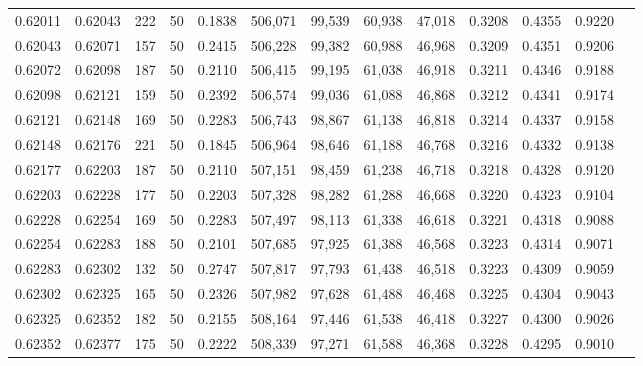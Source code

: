 \begin{tabular}{rrrrrrrrrrrrr}
0.62011 & 0.62043 &   222 &  50 &                                     0.1838 & 506,071 &  99,539 &  60,938 &  47,018 & 0.3208 & 0.4355 & 0.9220 \\
0.62043 & 0.62071 &   157 &  50 &                                     0.2415 & 506,228 &  99,382 &  60,988 &  46,968 & 0.3209 & 0.4351 & 0.9206 \\
0.62072 & 0.62098 &   187 &  50 &                                     0.2110 & 506,415 &  99,195 &  61,038 &  46,918 & 0.3211 & 0.4346 & 0.9188 \\
0.62098 & 0.62121 &   159 &  50 &                                     0.2392 & 506,574 &  99,036 &  61,088 &  46,868 & 0.3212 & 0.4341 & 0.9174 \\
0.62121 & 0.62148 &   169 &  50 &                                     0.2283 & 506,743 &  98,867 &  61,138 &  46,818 & 0.3214 & 0.4337 & 0.9158 \\
0.62148 & 0.62176 &   221 &  50 &                                     0.1845 & 506,964 &  98,646 &  61,188 &  46,768 & 0.3216 & 0.4332 & 0.9138 \\
0.62177 & 0.62203 &   187 &  50 &                                     0.2110 & 507,151 &  98,459 &  61,238 &  46,718 & 0.3218 & 0.4328 & 0.9120 \\
0.62203 & 0.62228 &   177 &  50 &                                     0.2203 & 507,328 &  98,282 &  61,288 &  46,668 & 0.3220 & 0.4323 & 0.9104 \\
0.62228 & 0.62254 &   169 &  50 &                                     0.2283 & 507,497 &  98,113 &  61,338 &  46,618 & 0.3221 & 0.4318 & 0.9088 \\
0.62254 & 0.62283 &   188 &  50 &                                     0.2101 & 507,685 &  97,925 &  61,388 &  46,568 & 0.3223 & 0.4314 & 0.9071 \\
0.62283 & 0.62302 &   132 &  50 &                                     0.2747 & 507,817 &  97,793 &  61,438 &  46,518 & 0.3223 & 0.4309 & 0.9059 \\
0.62302 & 0.62325 &   165 &  50 &                                     0.2326 & 507,982 &  97,628 &  61,488 &  46,468 & 0.3225 & 0.4304 & 0.9043 \\
0.62325 & 0.62352 &   182 &  50 &                                     0.2155 & 508,164 &  97,446 &  61,538 &  46,418 & 0.3227 & 0.4300 & 0.9026 \\
0.62352 & 0.62377 &   175 &  50 &                                     0.2222 & 508,339 &  97,271 &  61,588 &  46,368 & 0.3228 & 0.4295 & 0.9010 \\

\end{tabular}
